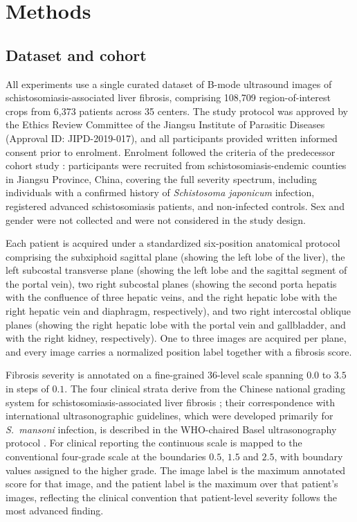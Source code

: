 \section{Methods}
\label{sec:methods}

\subsection{Dataset and cohort}

All experiments use a single curated dataset of B-mode ultrasound images of
schistosomiasis-associated liver fibrosis, comprising 108,709 region-of-interest
crops from 6,373 patients across 35 centers. The study protocol was approved by
the Ethics Review Committee of the Jiangsu Institute of Parasitic Diseases
(Approval ID: JIPD-2019-017), and all participants provided written informed
consent prior to enrolment. Enrolment followed the criteria of the predecessor
cohort study \cite{xu2026sfibai}: participants were recruited from
schistosomiasis-endemic counties in Jiangsu Province, China, covering the full
severity spectrum, including individuals with a confirmed history of
\textit{Schistosoma japonicum} infection, registered advanced schistosomiasis
patients, and non-infected controls. Sex and gender were not collected and were
not considered in the study design.

Each patient is acquired under a standardized six-position anatomical protocol
comprising the subxiphoid sagittal plane (showing the left lobe of the liver),
the left subcostal transverse plane (showing the left lobe and the sagittal
segment of the portal vein), two right subcostal planes (showing the second
porta hepatis with the confluence of three hepatic veins, and the right hepatic
lobe with the right hepatic vein and diaphragm, respectively), and two right
intercostal oblique planes (showing the right hepatic lobe with the portal vein
and gallbladder, and with the right kidney, respectively). One to three images
are acquired per plane, and every image carries a normalized position label
together with a fibrosis score.

Fibrosis severity is annotated on a fine-grained 36-level scale spanning
$0.0$ to $3.5$ in steps of $0.1$. The four clinical strata derive from the
Chinese national grading system for schistosomiasis-associated liver fibrosis
\cite{moh2000schistomanual,moh2006schistocriteria}; their correspondence with
international ultrasonographic guidelines, which were developed primarily for
\textit{S.~mansoni} infection, is described in the WHO-chaired Basel
ultrasonography protocol \cite{richter2025basel}. For clinical reporting the
continuous scale is mapped to the conventional four-grade scale at the
boundaries $0.5$, $1.5$ and $2.5$, with boundary values assigned to the higher
grade. The image label is the maximum annotated score for that image, and the
patient label is the maximum over that patient's images, reflecting the
clinical convention that patient-level severity follows the most advanced
finding.

